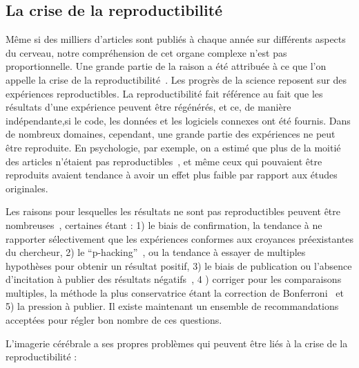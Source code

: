 \subsection*{La crise de la reproductibilité}
\label{sec:sommaire:reproducibility_crisis}
Même si des milliers d'articles sont publiés à chaque année sur différents aspects du cerveau, notre compréhension de cet organe complexe n'est pas proportionnelle. Une grande partie de la raison a été attribuée à ce que l'on appelle la crise de la reproductibilité~\citep{ioannidis2005most, simmons2011false, button2013power}.
Les progrès de la science reposent sur des expériences reproductibles. La reproductibilité fait référence au fait que les résultats d'une expérience peuvent être régénérés, et ce, de manière indépendante,si le code, les données et les logiciels connexes ont été fournis. Dans de nombreux domaines, cependant, une grande partie des expériences ne peut être reproduite. En psychologie, par exemple, on a estimé que plus de la moitié des articles n'étaient pas reproductibles~\citep{open2015estimating}, et même ceux qui pouvaient être reproduits avaient tendance à avoir un effet plus faible par rapport aux études originales.

Les raisons pour lesquelles les résultats ne sont pas reproductibles peuvent être nombreuses~\citep{baker20161}, certaines étant : 1) le biais de confirmation, la tendance à ne rapporter sélectivement que les expériences conformes aux croyances préexistantes du chercheur, 2) le ``p-hacking''~\citep{simmons2011false}, ou la tendance à essayer de multiples hypothèses pour obtenir un résultat positif, 3) le biais de publication ou l'absence d'incitation à publier des résultats négatifs~\citep{rosenthal1979file}, 4 ) corriger pour les comparaisons multiples, la méthode la plus conservatrice étant la correction de Bonferroni~\citep{dunn1961multiple} et 5) la pression à publier. Il existe maintenant un ensemble de recommandations acceptées pour régler bon nombre de ces questions. 

L'imagerie cérébrale a ses propres problèmes qui peuvent être liés à la crise de la reproductibilité :


